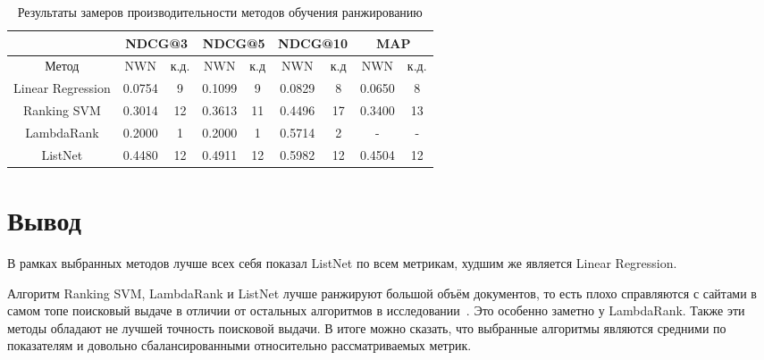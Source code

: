 \begin{table}[h]
	\begin{center}
		\begin{threeparttable}
			\captionsetup{justification=raggedright,singlelinecheck=off}
			\caption{Результаты замеров производительности методов обучения ранжированию}
			\label{tbl:measure}
			\begin{tabular}{|c|c|c|c|c|c|c|c|c|}
				\hline
				 & \multicolumn{2}{c|}{NDCG@3} & \multicolumn{2}{c|}{NDCG@5} & \multicolumn{2}{c|}{NDCG@10} & \multicolumn{2}{c|}{MAP} \\\hline
				Метод & NWN  & к.д. & NWN  & к.д & NWN  & к.д & NWN  & к.д. \\\hline
				Linear Regression & 0.0754 & 9 & 0.1099& 9& 0.0829& 8& 0.0650& 8 \\\hline
				Ranking SVM &  0.3014 & 12& 0.3613& 11& 0.4496& 17& 0.3400& 13 \\\hline
				LambdaRank &  0.2000 &1 &0.2000 &1 &0.5714& 2 &-& - \\\hline
				ListNet &  0.4480 &12 &0.4911 &12 &0.5982 &12 &0.4504 &12 \\\hline
			\end{tabular}
		\end{threeparttable}
	\end{center}
\end{table}

\section{Вывод}

В рамках выбранных методов лучше всех себя показал ListNet по всем метрикам, худшим же является Linear Regression.

Алгоритм Ranking SVM, LambdaRank и ListNet лучше ранжируют большой объём документов, то есть плохо справляются с сайтами в самом топе поисковый выдаче в отличии от остальных алгоритмов в исследовании~\cite{cmp}. Это особенно заметно у  LambdaRank. Также эти методы обладают не лучшей точность поисковой выдачи. В итоге можно сказать, что выбранные алгоритмы являются средними по показателям и довольно сбалансированными относительно рассматриваемых метрик.